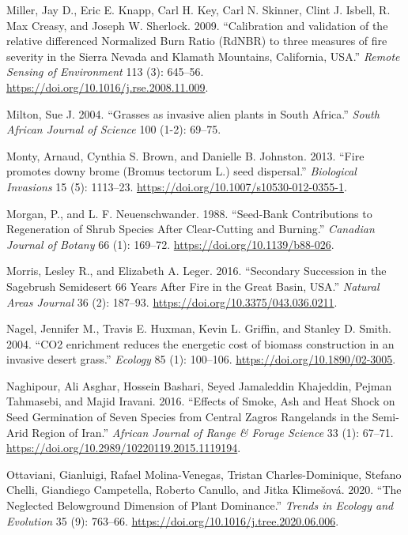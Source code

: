\documentclass[
  12pt,
]{article}
\newlength{\cslhangindent}
\newlength{\cslentryspacingunit} %
\newenvironment{CSLReferences}[2] %
 {%
  \setlength{\parindent}{0pt}
  \ifodd #1
  \let\oldpar\par
  \def\par{\hangindent=\cslhangindent\oldpar}
  \fi
  \setlength{\parskip}{#2\cslentryspacingunit}
 }%
 {}
\begin{document}
\begin{CSLReferences}{1}{0}
\leavevmode{}%
Miller, Jay D., Eric E. Knapp, Carl H. Key, Carl N. Skinner, Clint J.
Isbell, R. Max Creasy, and Joseph W. Sherlock. 2009. {``{Calibration and
validation of the relative differenced Normalized Burn Ratio (RdNBR) to
three measures of fire severity in the Sierra Nevada and Klamath
Mountains, California, USA}.''} \emph{Remote Sensing of Environment} 113
(3): 645--56. \url{https://doi.org/10.1016/j.rse.2008.11.009}.

\leavevmode{}%
Milton, Sue J. 2004. {``{Grasses as invasive alien plants in South
Africa}.''} \emph{South African Journal of Science} 100 (1-2): 69--75.

\leavevmode{}%
Monty, Arnaud, Cynthia S. Brown, and Danielle B. Johnston. 2013.
{``{Fire promotes downy brome (Bromus tectorum L.) seed dispersal}.''}
\emph{Biological Invasions} 15 (5): 1113--23.
\url{https://doi.org/10.1007/s10530-012-0355-1}.

\leavevmode{}%
Morgan, P., and L. F. Neuenschwander. 1988. {``Seed-Bank Contributions
to Regeneration of Shrub Species After Clear-Cutting and Burning.''}
\emph{Canadian Journal of Botany} 66 (1): 169--72.
\url{https://doi.org/10.1139/b88-026}.

\leavevmode{}%
Morris, Lesley R., and Elizabeth A. Leger. 2016. {``Secondary
{Succession} in the {Sagebrush} {Semidesert} 66 {Years} {After} {Fire}
in the {Great} {Basin}, {USA}.''} \emph{Natural Areas Journal} 36 (2):
187--93. \url{https://doi.org/10.3375/043.036.0211}.

\leavevmode{}%
Nagel, Jennifer M., Travis E. Huxman, Kevin L. Griffin, and Stanley D.
Smith. 2004. {``{CO2 enrichment reduces the energetic cost of biomass
construction in an invasive desert grass}.''} \emph{Ecology} 85 (1):
100--106. \url{https://doi.org/10.1890/02-3005}.

\leavevmode{}%
Naghipour, Ali Asghar, Hossein Bashari, Seyed Jamaleddin Khajeddin,
Pejman Tahmasebi, and Majid Iravani. 2016. {``Effects of Smoke, Ash and
Heat Shock on Seed Germination of Seven Species from {Central} {Zagros}
Rangelands in the Semi-Arid Region of {Iran}.''} \emph{African Journal
of Range \& Forage Science} 33 (1): 67--71.
\url{https://doi.org/10.2989/10220119.2015.1119194}.

\leavevmode{}%
Ottaviani, Gianluigi, Rafael Molina-Venegas, Tristan Charles-Dominique,
Stefano Chelli, Giandiego Campetella, Roberto Canullo, and Jitka
Klimešová. 2020. {``{The Neglected Belowground Dimension of Plant
Dominance}.''} \emph{Trends in Ecology and Evolution} 35 (9): 763--66.
\url{https://doi.org/10.1016/j.tree.2020.06.006}.


\end{CSLReferences}
\end{document}
